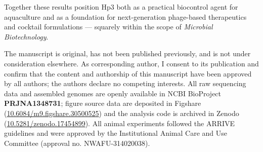 \documentclass[11pt,a4paper]{article}
\begin{document}
Together these results position Hp3 both as a practical biocontrol agent for
aquaculture and as a foundation for next-generation phage-based therapeutics
and cocktail formulations --- squarely within the scope of
\emph{Microbial Biotechnology}.

The manuscript is original, has not been published previously, and is not under
consideration elsewhere. As corresponding author, I consent to its publication
and confirm that the content and authorship of this manuscript have been
approved by all authors; the authors declare no competing interests. All raw sequencing data and assembled genomes are
openly available in NCBI BioProject \textbf{PRJNA1348731}; figure source data
are deposited in Figshare
(\href{https://doi.org/10.6084/m9.figshare.30500525}{10.6084/m9.figshare.30500525})
and the analysis code is archived in Zenodo
(\href{https://doi.org/10.5281/zenodo.17454899}{10.5281/zenodo.17454899}).
All animal experiments followed the ARRIVE guidelines and were approved by the
Institutional Animal Care and Use Committee (approval no. NWAFU-314020038).
\end{document}
